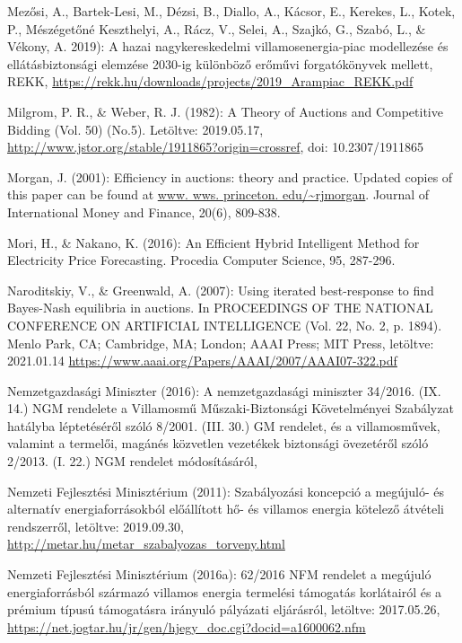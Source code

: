 \documentclass[twoside, magyar, showtrims]{corvinusphd}
\theoremstyle{plain}
\theoremstyle{remark}
\theoremstyle{definition}
\begin{document}
\begin{thebibliography}{99}
Mezősi, A., Bartek-Lesi, M., Dézsi, B., Diallo, A., Kácsor, E., Kerekes, L., Kotek, P., Mészégetőné Keszthelyi, A., Rácz, V., Selei, A., Szajkó, G., Szabó, L., \& Vékony, A. 2019): A hazai nagykereskedelmi villamosenergia-piac modellezése és ellátásbiztonsági elemzése 2030-ig különböző erőművi forgatókönyvek mellett, REKK, 
\url{https://rekk.hu/downloads/projects/2019\_Arampiac\_REKK.pdf}

Milgrom, P. R., \& Weber, R. J. (1982): A Theory of Auctions and Competitive Bidding (Vol. 50) (No.5). Letöltve: 2019.05.17, 
\url{http://www.jstor.org/stable/1911865?origin=crossref}, doi: 10.2307/1911865

Morgan, J. (2001): Efficiency in auctions: theory and practice.
Updated copies of this paper can be found at
\url{www. wws. princeton. edu/~rjmorgan}. Journal of International Money and Finance, 20(6), 809-838.

Mori, H., \& Nakano, K. (2016): An Efficient Hybrid Intelligent Method for Electricity Price Forecasting. Procedia Computer Science, 95, 287-296.

Naroditskiy, V., \& Greenwald, A. (2007): Using iterated best-response to find Bayes-Nash equilibria in auctions. In PROCEEDINGS OF THE NATIONAL CONFERENCE ON ARTIFICIAL INTELLIGENCE (Vol. 22, No. 2, p. 1894). Menlo Park, CA; Cambridge, MA; London; AAAI Press; MIT Press, letöltve: 2021.01.14
\url{https://www.aaai.org/Papers/AAAI/2007/AAAI07-322.pdf}

Nemzetgazdasági Miniszter (2016): A nemzetgazdasági miniszter 34/2016. (IX. 14.) NGM rendelete a Villamosmű Műszaki-Biztonsági Követelményei Szabályzat hatályba léptetéséről szóló 8/2001. (III. 30.) GM rendelet, és a villamosművek, valamint a termelői, magánés közvetlen vezetékek biztonsági övezetéről szóló 2/2013. (I. 22.) NGM rendelet módosításáról, 

Nemzeti Fejlesztési Minisztérium (2011): Szabályozási koncepció a megújuló- és alternatív energiaforrásokból előállított hő- és villamos energia kötelező átvételi rendszerről, letöltve: 2019.09.30,
\url{http://metar.hu/metar\_szabalyozas\_torveny.html}

Nemzeti Fejlesztési Minisztérium (2016a): 62/2016 NFM rendelet a megújuló energiaforrásból származó villamos energia termelési támogatás korlátairól és a prémium típusú támogatásra irányuló pályázati eljárásról, letöltve: 2017.05.26,
\url{https://net.jogtar.hu/jr/gen/hjegy\_doc.cgi?docid=a1600062.nfm}


\end{thebibliography}
\end{document}
